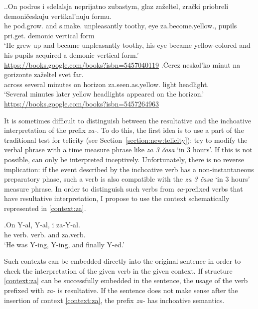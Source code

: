 \ex.\label{ex:zazeltet}\ag.\label{ex:zazeltet1}On podros i sdelalsja neprijatno zubastym, glaz za\v{z}eltel, zra\v{c}ki priobreli demoni\v{c}eskuju vertikal'nuju formu.\\
he pod.grow. and s.make. unpleasantly toothy, eye za.become.yellow., pupils pri.get. demonic vertical form\\
`He grew up and became unpleasantly toothy, his eye became yellow-colored and his pupils acquired a demonic vertical form.'\\\hbox{}\hfill\hbox{\url{https://books.google.com/books?isbn=5457040119}}
\bg.\label{ex:zazeltet2}\v{C}erez neskol'ko minut na gorizonte za\v{z}eltel svet far.\\
across several minutes on horizon za.seen.as.yellow. light headlight.\\
`Several minutes later yellow headlights appeared on the horizon.'\\\hbox{}\hfill\hbox{\url{https://books.google.com/books?isbn=5457264963}}

It is sometimes difficult to distinguish between the resultative and the inchoative interpretation of the prefix \textit{za-}. To do this, the first idea is to use a part of the traditional test for telicity (see Section~\ref{section:new:telicity}): try to modify the verbal phrase with a time measure phrase like \textit{za 3 \v{c}asa} `in 3 hours'. If this is not possible, can only be interpreted inceptively. Unfortunately, there is no reverse implication: if the event described by the inchoative verb has a non-instantaneous preparatory phase, such a verb is also compatible with the \textit{za 3 \v{c}asa} `in 3 hours' measure phrase. In order to distinguish such verbs from \textit{za}-prefixed verbs that have resultative interpretation, I propose to use the context schematically represented in \ref{context:za}.

\exg.\label{context:za}On Y-al, Y-al, i za-Y-al.\\
he verb. verb. and za.verb.\\
\trans `He was Y-ing, Y-ing, and finally Y-ed.'

Such contexts can be embedded directly into the original sentence in order to check the interpretation of the given verb in the given context. If structure \ref{context:za} can be successfully embedded in the sentence, the usage of the verb prefixed with \textit{za-} is resultative. If the sentence does not make sense after the insertion of context \ref{context:za}, the prefix \textit{za-} has inchoative semantics.

